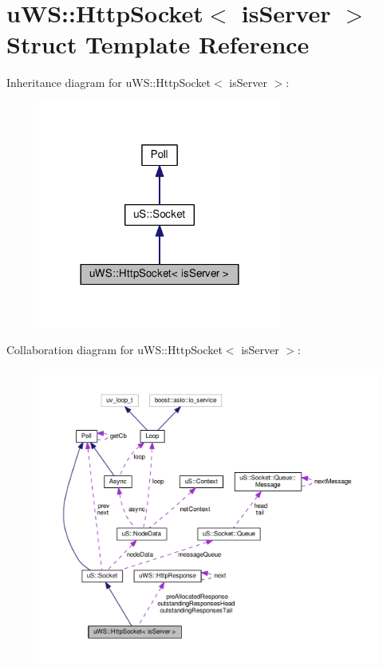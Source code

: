\hypertarget{structu_w_s_1_1_http_socket}{}\section{u\+WS\+:\+:Http\+Socket$<$ is\+Server $>$ Struct Template Reference}
\label{structu_w_s_1_1_http_socket}


Inheritance diagram for u\+WS\+:\+:Http\+Socket$<$ is\+Server $>$\+:
\nopagebreak
\begin{figure}[H]
\begin{center}
\leavevmode
\includegraphics[width=228pt]{structu_w_s_1_1_http_socket__inherit__graph}
\end{center}
\end{figure}


Collaboration diagram for u\+WS\+:\+:Http\+Socket$<$ is\+Server $>$\+:
\nopagebreak
\begin{figure}[H]
\begin{center}
\leavevmode
\includegraphics[width=350pt]{structu_w_s_1_1_http_socket__coll__graph}
\end{center}
\end{figure}
